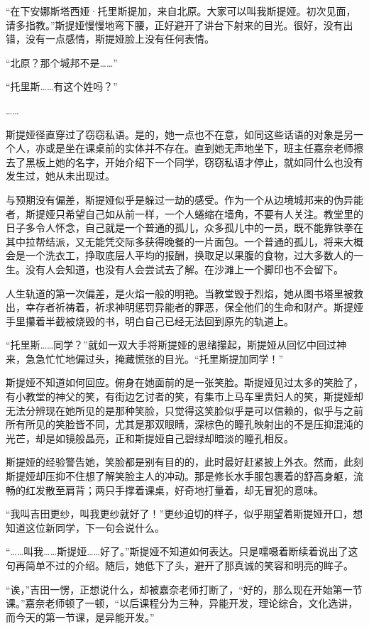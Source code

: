 \documentclass[a5paper, punct=kaiming, fontset=none]{ctexart}
\begin{document}
“在下安娜斯塔西娅·托里斯提加，来自北原。大家可以叫我斯提娅。初次见面，请多指教。”斯提娅慢慢地弯下腰，正好避开了讲台下射来的目光。很好，没有出错，没有一点感情，斯提娅脸上没有任何表情。

“北原？那个城邦不是……”

“托里斯……有这个姓吗？”

……

斯提娅径直穿过了窃窃私语。是的，她一点也不在意，如同这些话语的对象是另一个人，亦或是坐在课桌前的实体并不存在。直到她无声地坐下，班主任嘉奈老师擦去了黑板上她的名字，开始介绍下一个同学，窃窃私语才停止，就如同什么也没有发生过，她从未出现过。

与预期没有偏差，斯提娅似乎是躲过一劫的感受。作为一个从边境城邦来的伪异能者，斯提娅只希望自己如从前一样，一个人蜷缩在墙角，不要有人关注。教堂里的日子多令人怀念，自己就是一个普通的孤儿，众多孤儿中的一员，既不能靠铁拳在其中拉帮结派，又无能凭交际多获得晚餐的一片面包。一个普通的孤儿，将来大概会是一个洗衣工，挣取底层人平均的报酬，换取足以果腹的食物，过大多数人的一生。没有人会知道，也没有人会尝试去了解。在沙滩上一个脚印也不会留下。

人生轨道的第一次偏差，是火焰一般的明艳。当教堂毁于烈焰，她从图书塔里被救出，幸存者祈祷着，祈求神明惩罚异能者的罪恶，保全他们的生命和财产。斯提娅手里攥着半截被烧毁的书，明白自己已经无法回到原先的轨道上。

“托里斯……同学？”就如一双大手将斯提娅的思绪攥起，斯提娅从回忆中回过神来，急急忙忙地偏过头，掩藏慌张的目光。“托里斯提加同学！”

斯提娅不知道如何回应。俯身在她面前的是一张笑脸。斯提娅见过太多的笑脸了，有小教堂的神父的笑，有街边乞讨者的笑，有集市上马车里贵妇人的笑，斯提娅却无法分辨现在她所见的是那种笑脸，只觉得这笑脸似乎是可以信赖的，似乎与之前所有所见的笑脸皆不同，尤其是那双眼睛，深棕色的瞳孔映射出的不是压抑混沌的光芒，却是如镜般晶亮，正和斯提娅自己碧绿却暗淡的瞳孔相反。

斯提娅的经验警告她，笑脸都是别有目的的，此时最好赶紧披上外衣。然而，此刻斯提娅却压抑不住想了解笑脸主人的冲动。那是修长水手服包裹着的舒高身躯，流畅的红发散至肩背；两只手撑着课桌，好奇地打量着，却无冒犯的意味。

“我叫吉田更纱，叫我更纱就好了！”更纱迫切的样子，似乎期望着斯提娅开口，想知道这位新同学，下一句会说什么。

“……叫我……斯提娅……好了。”斯提娅不知道如何表达。只是嚅嗫着断续着说出了这句再简单不过的介绍。随后，她低下了头，避开了那真诚的笑容和明亮的眸子。

“诶，”吉田一愣，正想说什么，却被嘉奈老师打断了，“好的，那么现在开始第一节课。”嘉奈老师顿了一顿，“以后课程分为三种，异能开发，理论综合，文化选讲，而今天的第一节课，是异能开发。”
\end{document}
